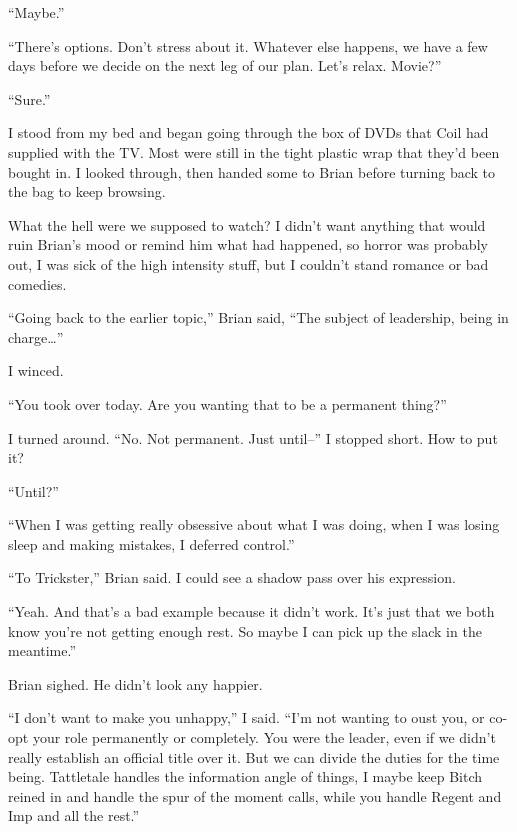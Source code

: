 ``Maybe.''



``There's options.  Don't stress about it.  Whatever else happens, we have a few days before we decide on the next leg of our plan.  Let's relax.  Movie?''



``Sure.''



I stood from my bed and began going through the box of DVDs that Coil had supplied with the TV.  Most were still in the tight plastic wrap that they'd been bought in.  I looked through, then handed some to Brian before turning back to the bag to keep browsing.



What the hell were we supposed to watch?  I didn't want anything that would ruin Brian's mood or remind him what had happened, so horror was probably out, I was sick of the high intensity stuff, but I couldn't stand romance or bad comedies.



``Going back to the earlier topic,'' Brian said, ``The subject of leadership, being in charge\ldots''



I winced.



``You took over today.  Are you wanting that to be a permanent thing?''



I turned around.  ``No.  Not permanent.  Just until--'' I stopped short.  How to put it?



``Until?''



``When I was getting really obsessive about what I was doing, when I was losing sleep and making mistakes, I deferred control.''



``To Trickster,'' Brian said.  I could see a shadow pass over his expression.



``Yeah.  And that's a bad example because it didn't work.  It's just that we both know you're not getting enough rest.  So maybe I can pick up the slack in the meantime.''



Brian sighed.  He didn't look any happier.



``I don't want to make you unhappy,'' I said.  ``I'm not wanting to oust you, or co-opt your role permanently or completely.  You were the leader, even if we didn't really establish an official title over it.  But we can divide the duties for the time being.  Tattletale handles the information angle of things, I maybe keep Bitch reined in and handle the spur of the moment calls, while you handle Regent and Imp and all the rest.''



